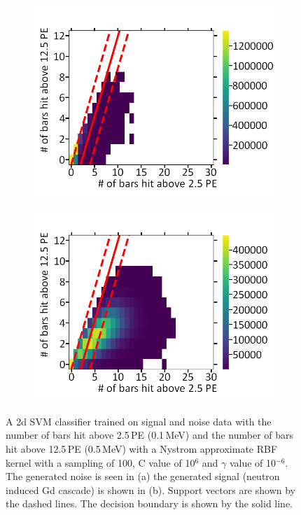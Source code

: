 \begin{figure}[!h]
\centering
\begin{subfigure}{.5\textwidth}
  \centering
  \includegraphics[width=\linewidth]{Chapter4/Figs/Raster/noiseNeutronSVM_C1e6_g1e-6MedText.png}
  \captionsetup{width=.9\linewidth}
  \caption{}
  \label{subFig:noiseNeutronSVM_C1e6_g1e-6}
\end{subfigure}%
\begin{subfigure}{.5\textwidth}
  \centering
  \includegraphics[width=\linewidth]{Chapter4/Figs/Raster/signalNeutronSVM_C1e6_g1e-6MedText.png}
  \captionsetup{width=.9\linewidth}
  \caption{}
  \label{subFig:signalNeutronSVM_C1e6_g1e-6}
\end{subfigure}
\caption{A 2d SVM classifier trained on signal and noise data with the number of bars hit above 2.5\,PE (0.1\,MeV) and the number of bars hit above 12.5\,PE (0.5\,MeV) with a Nystrom approximate RBF kernel with a sampling of 100, C value of 10$^6$ and $\gamma$ value of 10$^{-6}$. The generated noise is seen in (a) the generated signal (neutron induced Gd cascade) is shown in (b). Support vectors are shown by the dashed lines. The decision boundary is shown by the solid line.}
\label{fig:signalAndNoiseNeutronSVM_C1e6_g1e-6}
\end{figure}

